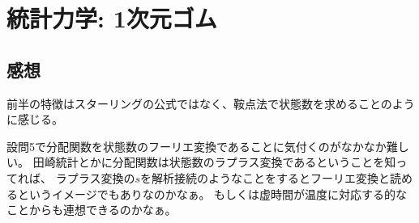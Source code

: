 \documentclass[../../sp_2014.tex]{subfiles}
\begin{document}
\section{統計力学: 1次元ゴム}


\subsection*{感想}
前半の特徴はスターリングの公式ではなく、鞍点法で状態数を求めることのように感じる。

設問5で分配関数を状態数のフーリエ変換であることに気付くのがなかなか難しい。
田崎統計とかに分配関数は状態数のラプラス変換であるということを知ってれば、
ラプラス変換の\(s\)を解析接続のようなことをするとフーリエ変換と読めるというイメージでもありなのかなぁ。
もしくは虚時間が温度に対応する的なことからも連想できるのかなぁ。
\end{document}
